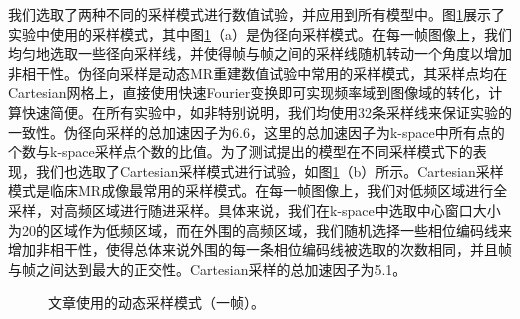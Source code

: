 我们选取了两种不同的采样模式进行数值试验，并应用到所有模型中。图\ref{fig:mask3}展示了实验中使用的采样模式，其中图\ref{fig:mask3}（a）是伪径向采样模式。在每一帧图像上，我们均匀地选取一些径向采样线，并使得帧与帧之间的采样线随机转动一个角度以增加非相干性。伪径向采样是动态MR重建数值试验中常用的采样模式，其采样点均在Cartesian网格上，直接使用快速Fourier变换即可实现频率域到图像域的转化，计算快速简便。在所有实验中，如非特别说明，我们均使用32条采样线来保证实验的一致性。伪径向采样的总加速因子为6.6，这里的总加速因子为k-space中所有点的个数与k-space采样点个数的比值。为了测试提出的模型在不同采样模式下的表现，我们也选取了Cartesian采样模式进行试验，如图\ref{fig:mask3}（b）所示。Cartesian采样模式是临床MR成像最常用的采样模式。在每一帧图像上，我们对低频区域进行全采样，对高频区域进行随进采样。具体来说，我们在k-space中选取中心窗口大小为20的区域作为低频区域，而在外围的高频区域，我们随机选择一些相位编码线来增加非相干性，使得总体来说外围的每一条相位编码线被选取的次数相同，并且帧与帧之间达到最大的正交性。Cartesian采样的总加速因子为5.1。
\begin{figure}[htbp]
\centering
{}
\centering
\caption{文章使用的动态采样模式（一帧）。}
\label{fig:mask3}
\end{figure}


